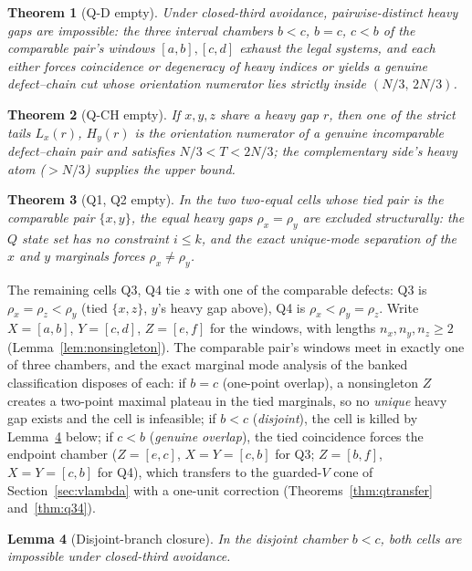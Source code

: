 \documentclass[11pt]{article}
\newtheorem{theorem}{Theorem}[section]
\newtheorem{lemma}[theorem]{Lemma}
\theoremstyle{definition}
\theoremstyle{remark}
\begin{document}
\begin{theorem}[Q-D empty]\label{thm:qd}
Under closed-third avoidance, pairwise-distinct heavy gaps are impossible: the three
interval chambers $b<c$, $b=c$, $c<b$ of the comparable pair's windows $[a,b],[c,d]$
exhaust the legal systems, and each either forces coincidence or degeneracy of heavy
indices or yields a genuine defect--chain cut whose orientation numerator lies strictly
inside $(N/3,\,2N/3)$.
\end{theorem}

\begin{theorem}[Q-CH empty]\label{thm:qch}
If $x,y,z$ share a heavy gap $r$, then one of the strict tails $L_x(r)$, $H_y(r)$ is the
orientation numerator of a genuine incomparable defect--chain pair and satisfies
$N/3<T<2N/3$; the complementary side's heavy atom ($>N/3$) supplies the upper bound.
\end{theorem}

\begin{theorem}[Q1, Q2 empty]\label{thm:q12}
In the two two-equal cells whose tied pair is the comparable pair $\{x,y\}$, the equal
heavy gaps $\rho_x=\rho_y$ are excluded structurally: the $Q$ state set has no
constraint $i\le k$, and the exact unique-mode separation of the $x$ and $y$ marginals
forces $\rho_x\neq\rho_y$.
\end{theorem}

The remaining cells Q3, Q4 tie $z$ with one of the comparable defects: Q3 is
$\rho_x=\rho_z<\rho_y$ (tied $\{x,z\}$, $y$'s heavy gap above), Q4 is
$\rho_x<\rho_y=\rho_z$. Write $X=[a,b]$, $Y=[c,d]$, $Z=[e,f]$ for the windows, with
lengths $n_x,n_y,n_z\ge2$ (Lemma~\ref{lem:nonsingleton}). The comparable pair's windows
meet in exactly one of three chambers, and the exact marginal mode analysis of the
banked classification disposes of each: if $b=c$ (one-point overlap), a nonsingleton
$Z$ creates a two-point maximal plateau in the tied marginals, so no \emph{unique}
heavy gap exists and the cell is infeasible; if $b<c$ (\emph{disjoint}), the cell is
killed by Lemma~\ref{lem:qdisjoint} below; if $c<b$ (\emph{genuine overlap}), the tied
coincidence forces the endpoint chamber ($Z=[e,c]$, $X=Y=[c,b]$ for Q3; $Z=[b,f]$,
$X=Y=[c,b]$ for Q4), which transfers to the guarded-$V$ cone of
Section~\ref{sec:vlambda} with a one-unit correction (Theorems~\ref{thm:qtransfer}
and~\ref{thm:q34}).

\begin{lemma}[Disjoint-branch closure]\label{lem:qdisjoint}
In the disjoint chamber $b<c$, both cells are impossible under closed-third avoidance.
\end{lemma}
\end{document}
